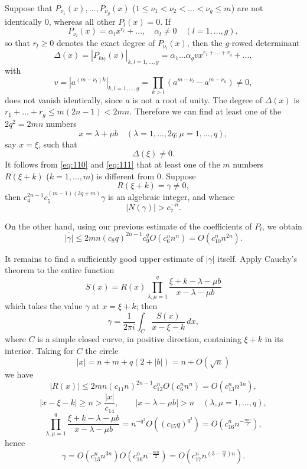 Suppose that $P_{\nu_1}(x), \dots, P_{\nu_g}(x)$ ($1 \le \nu_1 < \nu_2 < \dots < \nu_g \le m$) are not identically $0$, whereas all other $P_l(x) = 0$. If
\[
P_{\nu_l}(x) = \alpha_l x^{r_l} + \dots, \quad \alpha_l \neq 0 \quad (l=1,\dots,g),
\]
so that $r_l \ge 0$ denotes the exact degree of $P_{\nu_l}(x)$, then the $g$-rowed determinant
\[
\Delta(x) = | P_{k \nu_l}(x) |_{k,l=1,\dots,g} = \alpha_1 \dots \alpha_g v x^{r_1+\dots+r_g} + \dots,
\]
with
\[
v = |a^{(m-\nu_l)k}|_{k,l=1,\dots,g} = \prod_{k > l} (a^{m-\nu_l} - a^{m-\nu_k}) \neq 0,
\]
does not vanish identically, since $a$ is not a root of unity. The degree of $\Delta(x)$ is $r_1+\dots+r_g \le m(2n-1) < 2mn$. Therefore we can find at least one of the $2q^2 = 2mn$ numbers
\[
x = \lambda + \mu b \quad (\lambda = 1, \dots, 2q; \mu = 1, \dots, q),
\]
say $x = \xi$, such that
\[
\Delta(\xi) \neq 0.
\]
It follows from \eqref{eq:110} and \eqref{eq:111} that at least one of the $m$ numbers $R(\xi + k)$ ($k = 1, \dots, m$) is different from $0$. Suppose
\[
R(\xi + k) = \gamma \neq 0,
\]
then $c_4^{2n-1} c_5^{(m-1)(3q+m)} \gamma$ is an algebraic integer, and whence
\begin{equation}
|N(\gamma)| > c_7^{-n}. \tag{112}\label{eq:112}
\end{equation}

On the other hand, using our previous estimate of the coefficients of $P_l$, we obtain
\begin{equation}
\overline{|\gamma|} \le 2mn(c_8 q)^{2n-1} c_9^q O(c_6^n n^n) = O(c_{10}^n n^{2n}). \tag{113}\label{eq:113}
\end{equation}

It remains to find a sufficiently good upper estimate of $|\gamma|$ itself. Apply Cauchy's theorem to the entire function
\[
S(x) = R(x) \prod_{\lambda, \mu = 1}^{q} \frac{\xi+k - \lambda - \mu b}{x - \lambda - \mu b}
\]
which takes the value $\gamma$ at $x = \xi + k$; then
\[
\gamma = \frac{1}{2\pi i} \int_{C} \frac{S(x)}{x - \xi - k} \, dx,
\]
where $C$ is a simple closed curve, in positive direction, containing $\xi + k$ in its interior. Taking for $C$ the circle
\[
|x| = n + m + q(2+|b|) = n + O(\sqrt{n})
\]
we have
\[
|R(x)| \le 2mn(c_{11}n)^{2n-1} c_{12}^n O(c_6^n n^n) = O(c_{13}^n n^{3n}),
\]
\[
|x-\xi-k| \ge n > \frac{|x|}{c_{14}}, \qquad |x-\lambda-\mu b| > n \quad (\lambda, \mu=1,\dots,q),
\]
\[
\prod_{\lambda, \mu = 1}^{q} \frac{\xi+k-\lambda-\mu b}{x-\lambda-\mu b} = n^{-q^2} O((c_{15}q)^{q^2}) = O(c_{16}^n n^{-\frac{mn}{2}}),
\]
hence
\begin{equation}
\gamma = O(c_{13}^n n^{3n}) O(c_{16}^n n^{-\frac{mn}{2}}) = O(c_{17}^n n^{(3-\frac{m}{2})n}). \tag{114}\label{eq:114}
\end{equation}

